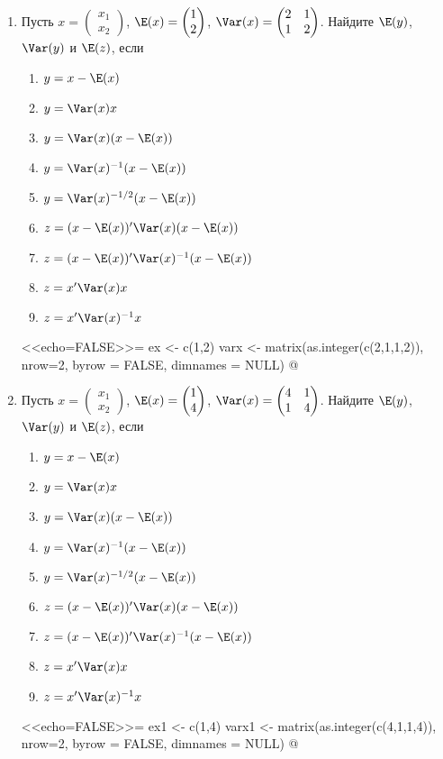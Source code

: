 \begin{enumerate}
\item Пусть  $x = \begin{pmatrix} x_1 \\ x_2 \end{pmatrix}$, $\E(x) = \begin{pmatrix} 1 \\ 2 \end{pmatrix}$, $\Var(x) = \begin{pmatrix} 2 & 1 \\ 1 & 2 \end{pmatrix}$. Найдите $\E(y)$, $\Var(y)$ и $\E(z)$, если
\begin{enumerate}
\item $y = x - \E(x)$
\item $y = \Var(x)x$
\item $y = \Var(x)(x - \E(x))$
\item $y = \Var(x)^{-1}(x - \E(x))$
\item $y = \Var(x)^{-1/2}(x - \E(x))$
\item $z = (x - \E(x))'\Var(x)(x - \E(x))$
\item $z = (x - \E(x))'\Var(x)^{-1}(x - \E(x))$
\item $z = x'\Var(x)x$
\item $z = x'\Var(x)^{-1}x$
\end{enumerate}
<<echo=FALSE>>=
ex <- c(1,2)
varx <- matrix(as.integer(c(2,1,1,2)), nrow=2, byrow = FALSE, dimnames = NULL)
@

\item Пусть  $x = \begin{pmatrix} x_1 \\ x_2 \end{pmatrix}$, $\E(x) = \begin{pmatrix} 1 \\ 4 \end{pmatrix}$, $\Var(x) = \begin{pmatrix} 4 & 1 \\ 1 & 4 \end{pmatrix}$. Найдите $\E(y)$, $\Var(y)$ и $\E(z)$, если
\begin{enumerate}
\item $y = x - \E(x)$
\item $y = \Var(x)x$
\item $y = \Var(x)(x - \E(x))$
\item $y = \Var(x)^{-1}(x - \E(x))$
\item $y = \Var(x)^{-1/2}(x - \E(x))$
\item $z = (x - \E(x))'\Var(x)(x - \E(x))$
\item $z = (x - \E(x))'\Var(x)^{-1}(x - \E(x))$
\item $z = x'\Var(x)x$
\item $z = x'\Var(x)^{-1}x$
\end{enumerate}
<<echo=FALSE>>=
ex1 <- c(1,4)
varx1 <- matrix(as.integer(c(4,1,1,4)), nrow=2, byrow = FALSE, dimnames = NULL)
@




\end{enumerate}